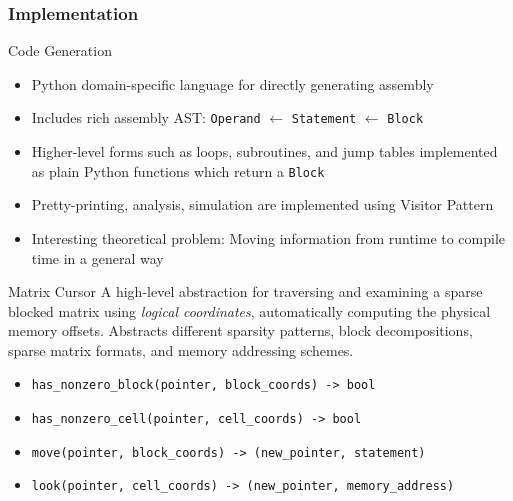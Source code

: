 \documentclass[9pt]{beamer}
\begin{document}
\begin{frame}[fragile]
  \frametitle{Implementation}

  \begin{block}{Code Generation}
    \begin{itemize}
    \item Python domain-specific language for directly generating assembly
    \item Includes rich assembly AST: \texttt{Operand} $\leftarrow$ \texttt{Statement} $\leftarrow$ \texttt{Block} 
    \item Higher-level forms such as loops, subroutines, and jump tables
          implemented as plain Python functions which return a \texttt{Block}
    \item Pretty-printing, analysis, simulation are implemented using Visitor Pattern
    \item Interesting theoretical problem: Moving information from runtime to compile time in a general way
    \end{itemize}
  \end{block}

  \begin{block}{Matrix Cursor}
    A high-level abstraction for traversing and examining a sparse blocked matrix using \emph{logical coordinates}, automatically computing the physical memory offsets. Abstracts different sparsity patterns, block decompositions, sparse matrix formats, and memory addressing schemes.
    \begin{itemize}
    \item \verb|has_nonzero_block(pointer, block_coords) -> bool|
    \item \verb|has_nonzero_cell(pointer, cell_coords) -> bool|
    \item \verb|move(pointer, block_coords) -> (new_pointer, statement)|
    \item \verb|look(pointer, cell_coords) -> (new_pointer, memory_address)|
    \end{itemize}
    \end{block}
\end{frame}
\end{document}
